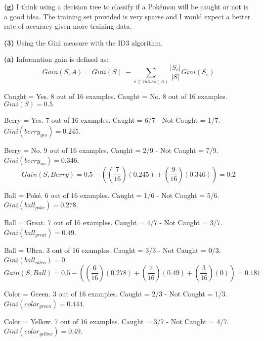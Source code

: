 \documentclass[11pt]{article}
\renewcommand\part[1]{\vspace{.10in}\textbf{(#1)}}
\begin{document}
 \par 

\part{g} I think using a decision tree to classify if a Pok\'{e}mon will be caught or not is a good idea. The training set provided is very sparse and I would expect a better rate of accuracy given more training data.

\part{3} Using the Gini measure with the ID3 algorithm.

\qquad \part{a} Information gain is defined as:
$$Gain(S, A) = Gini(S)\  - \sum_{v\in Values(A)} \frac{|S_v|}{|S|} Gini(S_v)$$

Caught = Yes. 8 out of 16 examples. Caught = No. 8 out of 16 examples. $Gini(S) = 0.5$ \newline

Berry = Yes. 7 out of 16 examples. Caught = 6/7 - Not Caught = 1/7. $Gini(berry_{yes}) = 0.245$.
 
Berry = No. 9 out of 16 examples. Caught = 2/9 - Not Caught = 7/9. $Gini(berry_{no}) = 0.346$.
$$Gain(S, Berry) = 0.5 - ((\frac{7}{16})(0.245) + (\frac{9}{16})(0.346)) = 0.2$$

 \par

Ball = Pok\'{e}. 6 out of 16 examples. Caught = 1/6 - Not Caught = 5/6. $Gini(ball_{poke}) = 0.278$.

Ball = Great. 7 out of 16 examples. Caught = 4/7 - Not Caught = 3/7. $Gini(ball_{great}) = 0.49$.

Ball = Ultra. 3 out of 16 examples. Caught = 3/3 - Not Caught = 0/3. $Gini(ball_{ultra}) = 0$.
$$Gain(S, Ball) = 0.5 - ((\frac{6}{16})(0.278) + (\frac{7}{16})(0.49) + (\frac{3}{16})(0)) = 0.181$$

 \par

Color = Green. 3 out of 16 examples. Caught = 2/3 - Not Caught = 1/3. $Gini(color_{green}) = 0.444$.

Color = Yellow. 7 out of 16 examples. Caught = 3/7 - Not Caught = 4/7. $Gini(color_{yellow}) = 0.49$.
\end{document}
